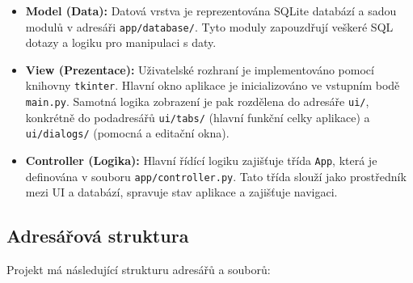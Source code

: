 \documentclass[
program=itk,
biblatex,
language=czech,
font=sans,
figures=true,
tables=false,
sourcecodes=false,
glossaries,
index
]{kidiplom}
\begin{document}
\begin{itemize}
    \item \textbf{Model (Data):} Datová vrstva je reprezentována SQLite databází a sadou modulů v adresáři \texttt{app/database/}. Tyto moduly zapouzdřují veškeré SQL dotazy a logiku pro manipulaci s daty.
    \item \textbf{View (Prezentace):} Uživatelské rozhraní je implementováno pomocí knihovny \texttt{tkinter}. Hlavní okno aplikace je inicializováno ve vstupním bodě \texttt{main.py}. Samotná logika zobrazení je pak rozdělena do adresáře \texttt{ui/}, konkrétně do podadresářů \texttt{ui/tabs/} (hlavní funkční celky aplikace) a \texttt{ui/dialogs/} (pomocná a editační okna).
    \item \textbf{Controller (Logika):} Hlavní řídící logiku zajišťuje třída \texttt{App}, která je definována v souboru \texttt{app/controller.py}. Tato třída slouží jako prostředník mezi UI a databází, spravuje stav aplikace a zajišťuje navigaci.
\end{itemize}

\subsection{Adresářová struktura}
Projekt má následující strukturu adresářů a souborů:
\end{document}
